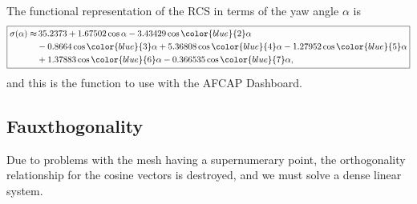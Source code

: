 The functional representation of the RCS in terms of the yaw angle $\alpha$ is
%
\begin{equation}
	\boxed{
	\begin{split}
\sigma(\alpha) \approx &\, 35.2373 + 1.67502 \cos \alpha - 3.43429 \cos {\color{blue}{2}} \alpha \\
	&-0.8664 \cos {\color{blue}{3}} \alpha+5.36808 \cos {\color{blue}{4}} \alpha-1.27952 \cos {\color{blue}{5}} \alpha \\
	& + 1.37883 \cos {\color{blue}{6}} \alpha -0.366535 \cos {\color{blue}{7}} \alpha,
	\end{split}}
\label{eq:fourier-expansion}
\end{equation}
and this is the function to use with the AFCAP Dashboard.

\subsection{Fauxthogonality}
Due to problems with the mesh having a supernumerary point, the orthogonality relationship for the cosine vectors is destroyed, and we must solve a dense linear system. 

